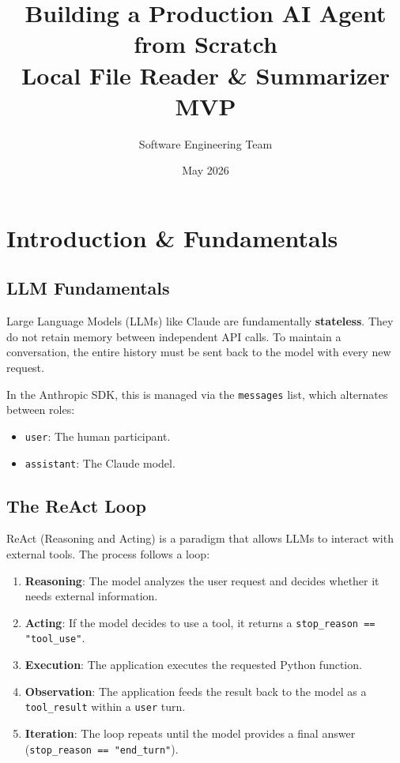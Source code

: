 \documentclass[11pt,a4paper]{report}
\title{Building a Production AI Agent from Scratch \\ \large Local File Reader \& Summarizer MVP}
\author{Software Engineering Team}
\date{May 2026}
\begin{document}
\maketitle

\tableofcontents

\chapter{Introduction \& Fundamentals}

\section{LLM Fundamentals}
Large Language Models (LLMs) like Claude are fundamentally \textbf{stateless}. They do not retain memory between independent API calls. To maintain a conversation, the entire history must be sent back to the model with every new request.

In the Anthropic SDK, this is managed via the \texttt{messages} list, which alternates between roles:
\begin{itemize}
    \item \texttt{user}: The human participant.
    \item \texttt{assistant}: The Claude model.
\end{itemize}

\section{The ReAct Loop}
ReAct (Reasoning and Acting) is a paradigm that allows LLMs to interact with external tools. The process follows a loop:
\begin{enumerate}
    \item \textbf{Reasoning}: The model analyzes the user request and decides whether it needs external information.
    \item \textbf{Acting}: If the model decides to use a tool, it returns a \texttt{stop\_reason == "tool\_use"}.
    \item \textbf{Execution}: The application executes the requested Python function.
    \item \textbf{Observation}: The application feeds the result back to the model as a \texttt{tool\_result} within a \texttt{user} turn.
    \item \textbf{Iteration}: The loop repeats until the model provides a final answer (\texttt{stop\_reason == "end\_turn"}).
\end{enumerate}
\end{document}
